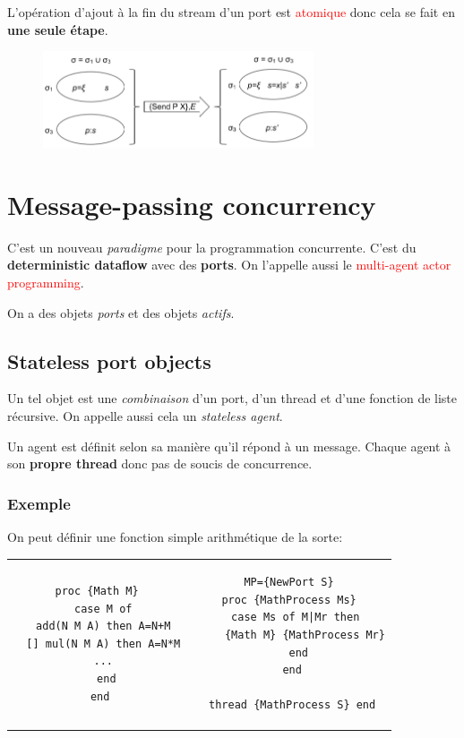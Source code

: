 \documentclass{report}
\begin{document}
L'opération d'ajout à la fin du stream d'un port est \textcolor{red}{atomique} donc cela se fait en \textbf{une seule étape}.

\begin{figure}[H]
\centering
\includegraphics[width=8cm]{img/semantiquePort.png}
\end{figure}

\section{Message-passing concurrency}
C'est un nouveau \textit{paradigme} pour la programmation concurrente. C'est du \textbf{deterministic dataflow } avec des \textbf{ports}. On l'appelle aussi le \textcolor{red}{multi-agent actor programming}.\par 
On a des objets \textit{ports} et des objets \textit{actifs}.

\subsection{Stateless port objects} \label{spo}
Un tel objet est une \textit{combinaison} d'un port, d'un thread et d'une fonction de liste récursive. On appelle aussi cela un \textit{stateless agent}. \par 
Un agent est définit selon sa manière qu'il répond à un message. Chaque agent à son \textbf{propre thread} donc pas de soucis de concurrence.

\subsubsection{Exemple}
On peut définir une fonction simple arithmétique de la sorte:
\begin{center}
\begin{tabular}{c|c}
\begin{lstlisting}[escapechar=\%]
proc {Math M} 
  case M of 
  add(N M A) then A=N+M 
  [] mul(N M A) then A=N*M 
  ... 
  end
end
\end{lstlisting} & \begin{lstlisting}[escapechar=\%]
MP={NewPort S} 
proc {MathProcess Ms} 
  case Ms of M|Mr then 
    {Math M} {MathProcess Mr}
  end
end

thread {MathProcess S} end
\end{lstlisting}

\end{tabular}
\end{center}
\end{document}
